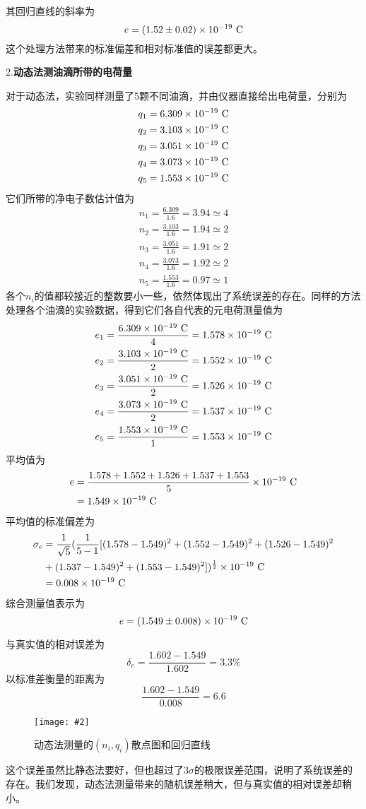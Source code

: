 \documentclass[11pt,a4paper]{ctexart}
\newcommand{\cpic}[2]{
\begin{center}
\texttt{[image: \#2]}
\end{center}
}
\newcommand{\cpicn}[3]
{
\begin{figure}[h!]
\cpic{#1}{#2}
\caption{#3\label{#2}}
\end{figure}
}
\newcommand{\beq}{\begin{equation}}
\newcommand{\eeq}{\end{equation}}
\newcommand{\bea}{\begin{equation}\begin{aligned}}
\newcommand{\eea}{\end{aligned}\end{equation}}
\begin{document}
其回归直线的斜率为
\beq
e = (1.52 \pm 0.02)\charge
\eeq
这个处理方法带来的标准偏差和相对标准值的误差都更大。
\\
\par
2.\textbf{动态法测油滴所带的电荷量}\par
对于动态法，实验同样测量了5颗不同油滴，并由仪器直接给出电荷量，分别为
\begin{gather}
	q_1 = 6.309 \times 10^{-19}\mathrm{\ C} \\
	q_2 = 3.103 \times 10^{-19}\mathrm{\ C} \\
	q_3 = 3.051 \times 10^{-19}\mathrm{\ C} \\
	q_4 = 3.073 \times 10^{-19}\mathrm{\ C} \\
	q_5 = 1.553 \times 10^{-19}\mathrm{\ C}
\end{gather}
它们所带的净电子数估计值为
\begin{gather}
	n_1 = \frac{6.309}{1.6} = 3.94 \simeq 4\\
	n_2 = \frac{3.103}{1.6} = 1.94 \simeq 2\\
	n_3 = \frac{3.051}{1.6} = 1.91 \simeq 2\\
	n_4 = \frac{3.073}{1.6} = 1.92 \simeq 2\\
	n_5 = \frac{1.553}{1.6} = 0.97 \simeq 1
\end{gather}
各个$n_i$的值都较接近的整数要小一些，依然体现出了系统误差的存在。同样的方法处理各个油滴的实验数据，得到它们各自代表的元电荷测量值为
\begin{gather}
	e_1 = \frac{6.309\times 10^{-19}\mathrm{\ C}}{4} = 1.578\times 10^{-19}\mathrm{\ C}\\
	e_2 = \frac{3.103\times 10^{-19}\mathrm{\ C}}{2} = 1.552\times 10^{-19}\mathrm{\ C}\\
	e_3 = \frac{3.051\times 10^{-19}\mathrm{\ C}}{2} = 1.526\times 10^{-19}\mathrm{\ C}\\
	e_4 = \frac{3.073\times 10^{-19}\mathrm{\ C}}{2} = 1.537\times 10^{-19}\mathrm{\ C}\\
	e_5 = \frac{1.553\times 10^{-19}\mathrm{\ C}}{1} = 1.553\times 10^{-19}\mathrm{\ C}
\end{gather}
平均值为
\bea
	e &= \frac{1.578+1.552+1.526+1.537+1.553}{5}\charge  \\ &= 1.549\charge
\eea
平均值的标准偏差为
\bea
\sigma_e &= \frac{1}{\sqrt{5}} (\frac{1}{5-1}[(1.578-1.549)^2 +(1.552-1.549)^2 +(1.526-1.549)^2 \\
&+(1.537-1.549)^2 +(1.553-1.549)^2 ])^{\frac{1}{2}} \charge \\
&= 0.008\charge
\eea
综合测量值表示为
\beq
	e = (1.549 \pm 0.008)\charge
\eeq

与真实值的相对误差为
\beq
\delta_e = \frac{1.602-1.549}{1.602} = 3.3\%
\eeq
以标准差衡量的距离为
\beq
\frac{1.602-1.549}{0.008} = 6.6
\eeq
\cpicn{0.4}{fitdyna}{动态法测量的$(n_i,q_i)$散点图和回归直线}
这个误差虽然比静态法要好，但也超过了$3\sigma$的极限误差范围，说明了系统误差的存在。我们发现，动态法测量带来的随机误差稍大，但与真实值的相对误差却稍小。
\par
\end{document}
